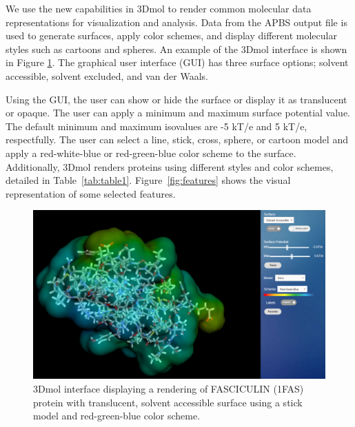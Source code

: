 \documentclass[journal=jpcbfk, manuscript=article]{achemso}
\begin{document}
We use the new capabilities in 3Dmol to render common molecular data representations for visualization and analysis.  Data from the APBS output file is used to generate surfaces, apply color schemes, and display different molecular styles such as cartoons and spheres. An example of the 3Dmol interface is shown in Figure \ref{fig:3dmol_interface}. The graphical user interface (GUI) has three surface options; solvent accessible, solvent excluded, and van der Waals. 

Using the GUI, the user can show or hide the surface or display it as translucent or opaque. The user can apply a minimum and maximum surface potential value. The default minimum and maximum isovalues are -5 kT/e and 5 kT/e, respectfully. The user can select a line, stick, cross, sphere, or cartoon model and apply a red-white-blue or red-green-blue color scheme to the surface. Additionally, 3Dmol renders proteins using different styles and color schemes, detailed in Table~\ref{tab:table1}.
Figure~\ref{fig:features} shows the visual representation of some selected features.

\begin{figure} 
	\begin{center}
		\includegraphics[width=.80\textwidth]{3dmol_interface.png}
		\caption{\small 3Dmol interface displaying a
			rendering of FASCICULIN (1FAS) protein with
			translucent, solvent accessible surface using a
			stick model and red-green-blue color scheme. 
			\color{black}  \label{fig:3dmol_interface}}  
	\end{center}  
\end{figure}
\end{document}

